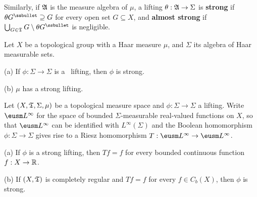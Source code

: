 Similarly, if $\frak A$ is the measure algebra of $\mu$, a lifting 
$\theta:\frak A\to\Sigma$ is {\bf strong} if  
$\theta G^{\ssbullet}\supseteq G$ for every open set $G\subseteq X$, and {\bf almost strong} if  
$\bigcup_{G\in\frak T}G\setminus\theta G^{\ssbullet}$ is negligible. 
      
 
      
 Let $X$ be a topological group with a Haar 
measure $\mu$, and $\Sigma$ its algebra of Haar measurable sets. 
      
(a) If $\phi:\Sigma\to\Sigma$ is 
a \lti\ lifting, then $\phi$ is strong. 
      
(b) $\mu$ has a strong lifting. 
      
      
      
 Let $(X,\frak T,\Sigma,\mu)$ be a topological 
measure space and $\phi:\Sigma\to\Sigma$ a lifting.   Write 
$\eusm L^{\infty}$ for the space of bounded $\Sigma$-measurable 
real-valued 
functions on $X$, so that $\eusm L^{\infty}$ can be identified with 
$L^{\infty}(\Sigma)$ and the Boolean homomorphism 
$\phi:\Sigma\to\Sigma$ gives rise to a Riesz homomorphism 
$T:\eusm L^{\infty}\to\eusm L^{\infty}$. 
      
(a) If $\phi$ is a strong lifting, then $Tf=f$ for every bounded 
continuous function $f:X\to\Bbb R$. 
      
(b) If $(X,\frak T)$ is completely regular and 
$Tf=f$ for every $f\in C_b(X)$, then 
$\phi$ is strong. 
      
